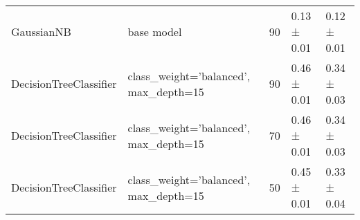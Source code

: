 \begin{tabular}{llrll}
    GaussianNB             & base model                                                                            & 90            & 0.13 ± 0.01    & 0.12 ± 0.01         \\
    DecisionTreeClassifier & class\_weight='balanced', max\_depth=15                                               & 90            & 0.46 ± 0.01    & 0.34 ± 0.03         \\
    DecisionTreeClassifier & class\_weight='balanced', max\_depth=15                                               & 70            & 0.46 ± 0.01    & 0.34 ± 0.03         \\
    DecisionTreeClassifier & class\_weight='balanced', max\_depth=15                                               & 50            & 0.45 ± 0.01    & 0.33 ± 0.04         \\
    \bottomrule
\end{tabular}
